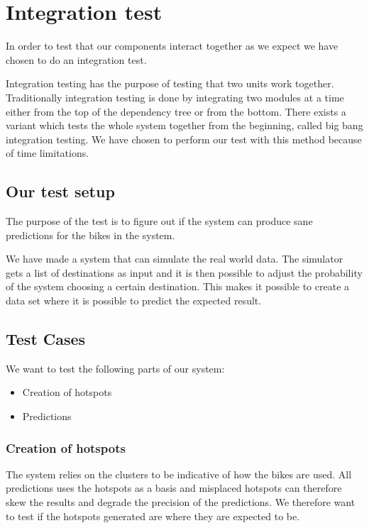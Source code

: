 \section{Integration test}

In order to test that our components interact together as we expect we have chosen to do an integration test.

Integration testing has the purpose of testing that two units work together. 
Traditionally integration testing is done by integrating two modules at a time either from the top of the dependency tree or from the bottom.
There exists a variant which tests the whole system together from the beginning, called big bang integration testing.
We have chosen to perform our test with this method because of time limitations. \cite{inttest}

\subsection{Our test setup}
The purpose of the test is to figure out if the system can produce sane predictions for the bikes in the system.


We have made a system that can simulate the real world data. 
The simulator gets a list of destinations as input and it is then possible to adjust the probability of the system choosing a certain destination. 
This makes it possible to create a data set where it is possible to predict the expected result.


\subsection{Test Cases}

We want to test the following parts of our system:

\begin{itemize}
\item Creation of hotspots
\item Predictions 
\end{itemize}

\subsubsection{Creation of hotspots}
The system relies on the clusters to be indicative of how the bikes are used. 
All predictions uses the hotspots as a basis and misplaced hotspots can therefore skew the results and degrade the precision of the predictions.
We therefore want to test if the hotspots generated are where they are expected to be.

